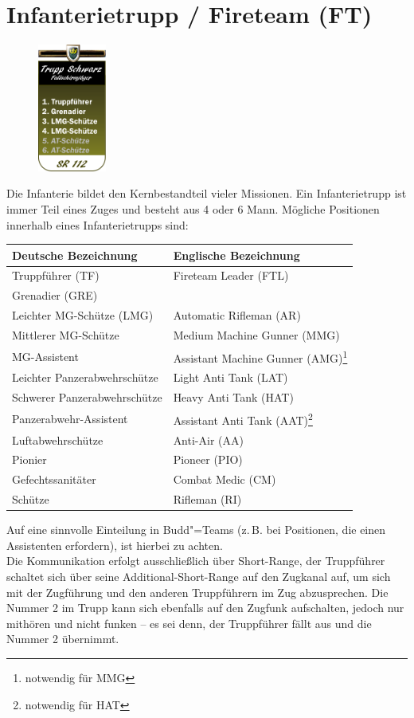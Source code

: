 \section{Infanterietrupp / Fireteam (FT)}
\begin{figure}
	\vspace{-50pt}
	\centering 
	\includegraphics[width=0.2\textwidth]{../img/truppenordnung/infanterie/infanterie}
	\vspace{-90pt}
\end{figure}
Die Infanterie bildet den Kernbestandteil vieler Missionen. Ein Infanterietrupp ist immer Teil eines Zuges und besteht aus 4 oder 6 Mann. Mögliche Positionen innerhalb eines Infanterietrupps sind:
\vspace{3.5cm}
\begin{longtable}{@{}P{0.4\textwidth}P{0.4\textwidth}@{}}
	\toprule
	Deutsche Bezeichnung & Englische Bezeichnung\\
	\midrule
	Truppführer (TF) & Fireteam Leader (FTL)\\
	Grenadier (GRE) & \\
	Leichter MG-Schütze (LMG) & Automatic Rifleman (AR)\\
	Mittlerer MG-Schütze & Medium Machine Gunner (MMG) \\
	MG-Assistent & Assistant Machine Gunner (AMG)\footnote{notwendig für MMG}\\ 
	Leichter Panzerabwehrschütze & Light Anti Tank (LAT)\\
	Schwerer Panzerabwehrschütze & Heavy Anti Tank (HAT)\\
	Panzerabwehr-Assistent & Assistant Anti Tank (AAT)\footnote{notwendig für HAT}\\ 
	Luftabwehrschütze & Anti-Air (AA)\\
	Pionier & Pioneer (PIO)\\
	Gefechtssanitäter & Combat Medic (CM)\\
	Schütze & Rifleman (RI)\\			
	\bottomrule					
\end{longtable}


Auf eine sinnvolle Einteilung in Budd"=Teams (z.\,B. bei Positionen, die einen Assistenten erfordern), ist hierbei zu achten.\\
Die Kommunikation erfolgt ausschließlich über Short-Range, der Truppführer schaltet sich über seine Additional-Short-Range auf den Zugkanal auf, um sich mit der Zugführung und den anderen Truppführern im Zug abzusprechen. Die Nummer 2 im Trupp kann sich ebenfalls auf den Zugfunk aufschalten, jedoch nur mithören und nicht funken -- es sei denn, der Truppführer fällt aus und die Nummer 2 übernimmt.